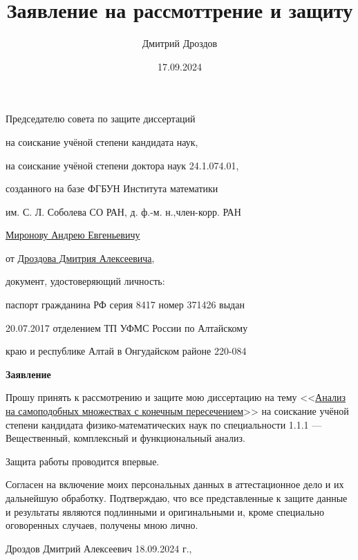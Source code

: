 \documentclass[14pt, a4paper]{extarticle}
\title{Заявление на рассмоттрение и защиту}
\author{Дмитрий Дроздов}
\date{17.09.2024}
\begin{document}
\noindent\hspace{4cm}Председателю совета по защите диссертаций\par
\noindent\hspace{4cm}на соискание учёной степени кандидата наук,\par
\noindent\hspace{4cm}на соискание учёной степени доктора наук 24.1.074.01,\par
\noindent\hspace{4cm}созданного на базе ФГБУН Института математики\par
\noindent\hspace{4cm}им. С. Л. Соболева СО РАН, д. ф.-м. н.,член-корр. РАН \par
\noindent\hspace{4cm}\underline{Миронову Андрею Евгеньевичу}\par
\noindent\hspace{4cm}от \underline{Дроздова Дмитрия Алексеевича},\par
\noindent\hspace{4cm}документ, удостоверяющий личность: \par
\noindent\hspace{4cm}паспорт гражданина РФ серия 8417 номер 371426 выдан \par
\noindent\hspace{4cm}20.07.2017 отделением ТП УФМС России по Алтайскому\par
\noindent\hspace{4cm}краю и республике Алтай в Онгудайском районе 220-084\par


\vspace{1cm}

\begin{center}\bf
Заявление  
\end{center}

\vspace{1cm}

Прошу принять к рассмотрению и защите мою диссертацию на тему \linebreak <<\underline{Анализ на самоподобных множествах с конечным пересечением}>> на соискание учёной степени кандидата физико-математических наук по специальности 1.1.1 --- Вещественный, комплексный и функциональный анализ.

\vspace{0.5cm}
Защита работы проводится впервые.

\vspace{0.5cm}
Согласен на включение моих персональных данных в аттестационное дело и их дальнейшую обработку.
Подтверждаю, что все представленные к защите данные и результаты являются подлинными и оригинальными и, кроме специально оговоренных случаев, получены мною лично.


\vspace{1cm}

\noindent Дроздов Дмитрий Алексеевич
\hfill 18.09.2024 г., 
\hfill \underline{\hspace{4cm}}

\end{document}
